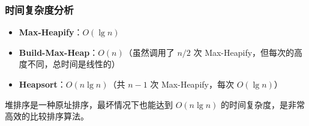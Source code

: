 

\subsubsection{时间复杂度分析}

\begin{itemize}
    \item \textbf{Max-Heapify}：\( O(\lg n) \)
    \item \textbf{Build-Max-Heap}：\( O(n) \)（虽然调用了 \( n/2 \) 次 Max-Heapify，但每次的高度不同，总时间是线性的）
    \item \textbf{Heapsort}：\( O(n \lg n) \)（共 \( n-1 \) 次 Max-Heapify，每次 \( O(\lg n) \)）
\end{itemize}

堆排序是一种原址排序，最坏情况下也能达到 \( O(n \lg n) \) 的时间复杂度，是非常高效的比较排序算法。
